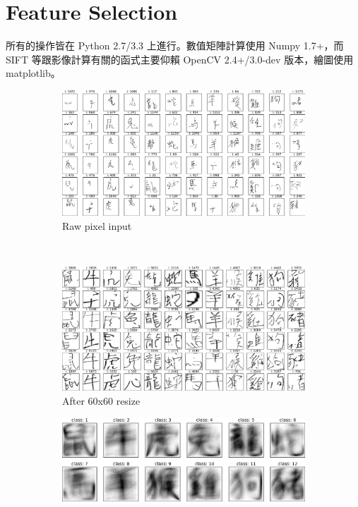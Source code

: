 \section{Feature Selection}
所有的操作皆在 Python 2.7/3.3 上進行。數值矩陣計算使用 Numpy 1.7+，而 SIFT 等跟影像計算有關的函式主要仰賴 OpenCV 2.4+/3.0-dev 版本，繪圖使用 matplotlib。

\begin{figure}[htb]
    \centering
    \begin{subfigure}[b]{0.48\textwidth}
        \centering
        \includegraphics[scale=0.23]{../results/figs/train_pixelview_combined_6}
        \caption{Raw pixel input}
        \label{fig:px-raw}
    \end{subfigure}%
    ~
    \begin{subfigure}[b]{0.48\textwidth}
        \centering
        \includegraphics[scale=0.23]{../results/figs/train_pixelview_allzoidac_60x60_6}
        \caption{After 60x60 resize}
        \label{fig:px-60}
    \end{subfigure}
    \begin{subfigure}[b]{0.98\textwidth}
        \centering
        \includegraphics[scale=0.4]{../results/figs/60x60_avg}

\end{subfigure}
\end{figure}
